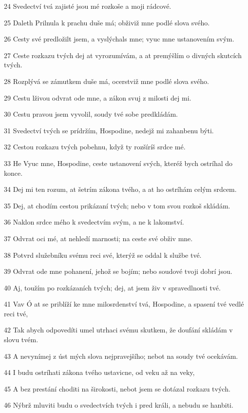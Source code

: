 \par 24 Svedectví tvá zajisté jsou mé rozkoše a moji rádcové.
\par 25 Daleth Prilnula k prachu duše má; obživiž mne podlé slova svého.
\par 26 Cesty své predložilt jsem, a vyslýchals mne; vyuc mne ustanovením svým.
\par 27 Ceste rozkazu tvých dej at vyrozumívám, a at premýšlím o divných skutcích tvých.
\par 28 Rozplývá se zámutkem duše má, ocerstviž mne podlé slova svého.
\par 29 Cestu lživou odvrat ode mne, a zákon svuj z milosti dej mi.
\par 30 Cestu pravou jsem vyvolil, soudy tvé sobe predkládám.
\par 31 Svedectví tvých se prídržím, Hospodine, nedejž mi zahanbenu býti.
\par 32 Cestou rozkazu tvých pobehnu, když ty rozšíríš srdce mé.
\par 33 He Vyuc mne, Hospodine, ceste ustanovení svých, kteréž bych ostríhal do konce.
\par 34 Dej mi ten rozum, at šetrím zákona tvého, a at ho ostríhám celým srdcem.
\par 35 Dej, at chodím cestou prikázaní tvých; nebo v tom svou rozkoš skládám.
\par 36 Naklon srdce mého k svedectvím svým, a ne k lakomství.
\par 37 Odvrat oci mé, at nehledí marnosti; na ceste své obživ mne.
\par 38 Potvrd služebníku svému reci své, kterýž se oddal k službe tvé.
\par 39 Odvrat ode mne pohanení, jehož se bojím; nebo soudové tvoji dobrí jsou.
\par 40 Aj, toužím po rozkázaních tvých; dej, at jsem živ v spravedlnosti tvé.
\par 41 Vav Ó at se priblíží ke mne milosrdenství tvá, Hospodine, a spasení tvé vedlé reci tvé,
\par 42 Tak abych odpovedíti umel utrhaci svému skutkem, že doufání skládám v slovu tvém.
\par 43 A nevynímej z úst mých slova nejpravejšího; nebot na soudy tvé ocekávám.
\par 44 I budu ostríhati zákona tvého ustavicne, od veku až na veky,
\par 45 A bez prestání choditi na širokosti, nebot jsem se dotázal rozkazu tvých.
\par 46 Nýbrž mluviti budu o svedectvích tvých i pred králi, a nebudu se hanbiti.
